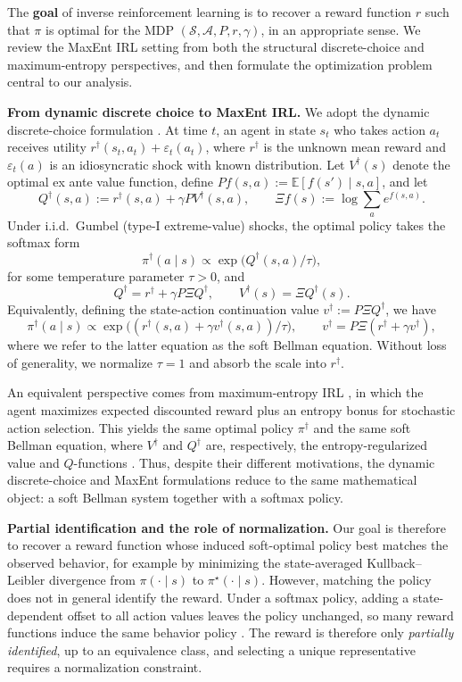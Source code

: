 \documentclass{article}
\newcommand{\E}{\mathbb{E}}
\newcommand{\1}{\mathbbm{1}}
\begin{document}
The \textbf{goal} of inverse reinforcement learning is to recover a reward function
\(r\) such that \(\pi\) is optimal for the MDP
\((\mathcal S,\mathcal A,P,r,\gamma)\), in an appropriate sense. We review the MaxEnt IRL setting from both the structural discrete-choice and
maximum-entropy perspectives, and then formulate the optimization problem
central to our analysis.

\textbf{From dynamic discrete choice to MaxEnt IRL.}
We adopt the dynamic discrete-choice formulation
\citep{rust1987optimal,hotz1993conditional,aguirregabiria2010dynamic}. At
time \(t\), an agent in state \(s_t\) who takes action \(a_t\) receives utility
\(r^\dagger(s_t,a_t)+\varepsilon_t(a_t)\), where \(r^\dagger\) is the unknown
mean reward and \(\varepsilon_t(a)\) is an idiosyncratic shock with known
distribution. Let \(V^\dagger(s)\) denote the optimal ex ante value function,
define \(Pf(s,a):=\E[f(s')\mid s,a]\), and let
\[
Q^\dagger(s,a):=r^\dagger(s,a)+\gamma PV^\dagger(s,a),
\qquad
\Xi f(s):=\log\sum_a e^{f(s,a)}.
\]
Under i.i.d.\ Gumbel (type-I extreme-value) shocks, the optimal policy takes the softmax form
\[
\pi^\dagger(a\mid s)\propto \exp\!\bigl(Q^\dagger(s,a)/\tau\bigr),
\]
for some temperature parameter \(\tau>0\), and
\[
Q^\dagger = r^\dagger+\gamma P\Xi Q^\dagger,
\qquad
V^\dagger(s)=\Xi Q^\dagger(s).
\]
Equivalently, defining the state-action continuation value
\(v^\dagger:=P\Xi Q^\dagger\), we have
\[
\pi^\dagger(a\mid s)\propto \exp\!\bigl((r^\dagger(s,a)+\gamma v^\dagger(s,a))/\tau\bigr),
\qquad
v^\dagger=P\Xi(r^\dagger+\gamma v^\dagger),
\]
where we refer to the latter equation as the soft Bellman equation. Without loss of generality, we normalize \(\tau=1\) and absorb the scale into \(r^\dagger\).


 
 
 An equivalent perspective comes from maximum-entropy IRL
\citep{ziebart2008maximum,ziebart2010modeling}, in which the agent maximizes
expected discounted reward plus an entropy bonus for stochastic action
selection. This yields the same optimal policy \(\pi^\dagger\) and the same
soft Bellman equation, where \(V^\dagger\) and \(Q^\dagger\) are,
respectively, the entropy-regularized value and \(Q\)-functions
\citep{haarnoja2017reinforcement}. Thus, despite their different motivations,
the dynamic discrete-choice and MaxEnt formulations reduce to the same
mathematical object: a soft Bellman system together with a softmax policy.


\textbf{Partial identification and the role of normalization.}
Our goal is therefore to recover a reward function whose induced soft-optimal
policy best matches the observed behavior, for example by minimizing the
state-averaged Kullback--Leibler divergence from \(\pi(\cdot\mid s)\) to
\(\pi^\star(\cdot\mid s)\). However, matching the policy does not in general
identify the reward. Under a softmax policy, adding a state-dependent offset to
all action values leaves the policy unchanged, so many reward functions induce
the same behavior policy
\citep{ziebart2010modeling,cao2021identifiability}. The reward is therefore
only \emph{partially identified}, up to an equivalence class, and selecting a
unique representative requires a normalization constraint.
\end{document}
